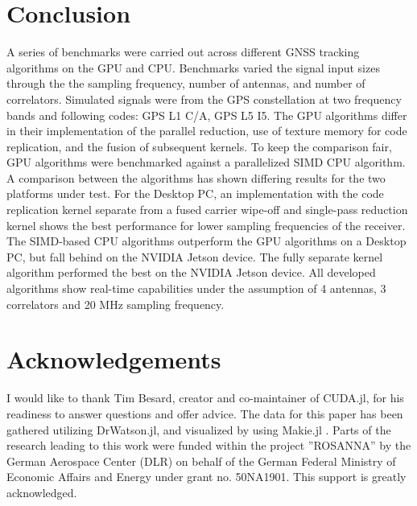 \documentclass{juliacon}
\begin{document}
\section{Conclusion}\label{sec:conclusion}
A series of benchmarks were carried out across different GNSS tracking algorithms on the GPU and CPU. Benchmarks varied the signal input sizes through the the sampling frequency, number of antennas, and number of correlators. Simulated signals were from the GPS constellation at two frequency bands and following codes: GPS L1 C/A, GPS L5 I5. The GPU algorithms differ in their implementation of the parallel reduction, use of texture memory for code replication, and the fusion of subsequent kernels. To keep the comparison fair, GPU algorithms were benchmarked against a parallelized SIMD CPU algorithm. A comparison between the algorithms has shown differing results for the two platforms under test. For the Desktop PC, an implementation with the code replication kernel separate from a fused carrier wipe-off and single-pass reduction kernel shows the best performance for lower sampling frequencies of the receiver. The SIMD-based CPU algorithms outperform the GPU algorithms on a Desktop PC, but fall behind on the NVIDIA Jetson device. The fully separate kernel algorithm performed the best on the NVIDIA Jetson device. All developed algorithms show real-time capabilities under the assumption of 4 antennas, 3 correlators and 20 MHz sampling frequency.

\section*{Acknowledgements}
I would like to thank Tim Besard, creator and co-maintainer of CUDA.jl, for his readiness to answer questions and offer advice. The data for this paper has been gathered utilizing DrWatson.jl, and visualized by using Makie.jl \cite{Datseris2020, Danisch2021}. Parts of the research leading to this work were funded within the project ”ROSANNA” by the German Aerospace Center (DLR) on behalf of the German Federal Ministry of Economic Affairs and Energy under grant no. 50NA1901. This support is greatly acknowledged.



\newpage
\end{document}
